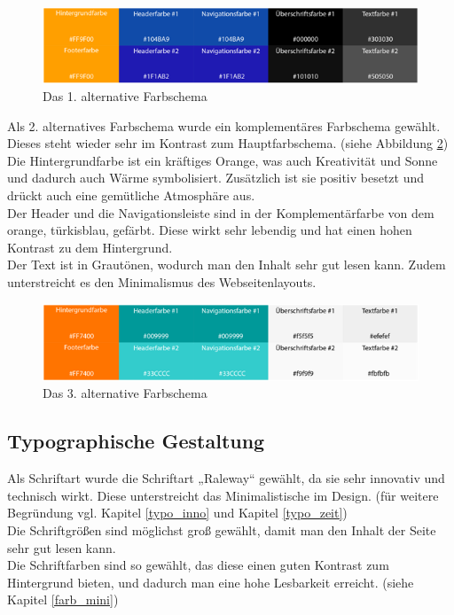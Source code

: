 \begin{figure} [hp]
\includegraphics[width=\textwidth]{./img/mini_farb2.png}
\caption{Das 1. alternative Farbschema }
\label{mini_farb2}
\end{figure}

Als 2. alternatives Farbschema wurde ein komplementäres Farbschema gewählt. Dieses steht wieder sehr im Kontrast zum Hauptfarbschema. (siehe Abbildung \ref{mini_farb3})
\\
Die Hintergrundfarbe ist ein kräftiges Orange, was auch Kreativität und Sonne und dadurch auch Wärme symbolisiert. Zusätzlich ist sie positiv besetzt und drückt auch eine gemütliche Atmosphäre aus.
\\
Der Header und die Navigationsleiste sind in der Komplementärfarbe von dem orange, türkisblau,  gefärbt. Diese wirkt sehr lebendig und hat einen hohen Kontrast zu dem Hintergrund.
\\
Der Text ist in Grautönen, wodurch man den Inhalt sehr gut lesen kann. Zudem unterstreicht es den Minimalismus des Webseitenlayouts.

\begin{figure} [hp]
\includegraphics[width=\textwidth]{./img/mini_farb3.png}
\caption{Das 3. alternative Farbschema }
\label{mini_farb3}
\end{figure}

	\subsection{Typographische Gestaltung}\label{chapter:mini:typo}

Als Schriftart wurde die Schriftart „Raleway“ gewählt, da sie sehr innovativ und technisch wirkt. Diese unterstreicht das Minimalistische im Design. (für weitere Begründung vgl. Kapitel \ref{typo_inno} und Kapitel \ref{typo_zeit})
\\
Die Schriftgrößen sind möglichst groß gewählt, damit man den Inhalt der Seite sehr gut lesen kann.
\\
Die Schriftfarben sind so gewählt, das diese einen guten Kontrast zum Hintergrund bieten, und dadurch man eine hohe Lesbarkeit erreicht. (siehe Kapitel \ref{farb_mini})


